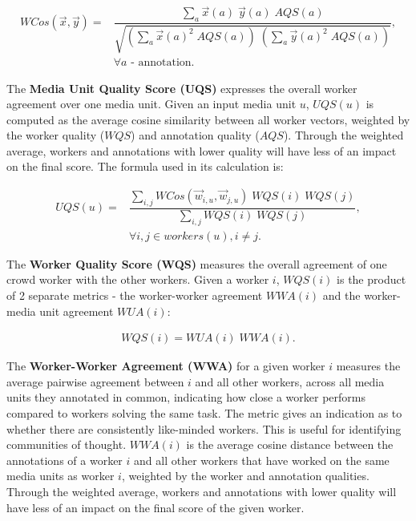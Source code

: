 \begin{align}
WCos(\vec{x}, \vec{y}) = & \dfrac{\sum\limits_{a} \vec{x} (a) \; \vec{y} (a) \;  AQS(a)}{\sqrt{(\sum\limits_{a} \vec{x}(a)^2 \; AQS(a)) \; (\sum\limits_{a} \vec{y}(a)^2 \; AQS(a))}}, \\
& \forall a \text{ - annotation}. \nonumber
\end{align}

The \textbf{Media Unit Quality Score (UQS)} expresses the overall worker agreement over one media unit. Given an input media unit $u$, $UQS(u)$ is computed as the average cosine similarity between all worker vectors, weighted by the worker quality ($WQS$) and annotation quality ($AQS$). Through the weighted average, workers and annotations with lower quality will have less of an impact on the final score. The formula used in its calculation is:

\begin{align}
UQS(u) = & \dfrac{\sum\limits_{i, j} WCos(\vec{w}_{i,u} , \vec{w}_{j,u}) \; WQS(i) \; WQS(j)}{\sum\limits_{i,j} WQS(i) \; WQS(j)}, \\
& \forall i, j \in workers(u), i \neq j. \nonumber
\end{align}

The \textbf{Worker Quality Score (WQS)} measures the overall agreement of one crowd worker with the other workers. Given a worker $i$, $WQS(i)$ is the product of 2 separate metrics - the worker-worker agreement $WWA(i)$ and the worker-media unit agreement $WUA(i)$:

\begin{align}
WQS(i) = WUA(i) \; WWA(i) .
\end{align}

The \textbf{Worker-Worker Agreement (WWA)} for a given worker $i$ measures the average pairwise agreement between $i$ and all other workers, across all media units they annotated in common, indicating how close a worker performs compared to workers solving the same task.  The metric gives an indication as to whether there are consistently like-minded workers. This is useful for identifying communities of thought. $WWA(i)$ is the average cosine distance between the annotations of a worker $i$ and all other workers that have worked on the same media units as worker $i$, weighted by the worker and annotation qualities. Through the weighted average, workers and annotations with lower quality will have less of an impact on the final score of the given worker.

